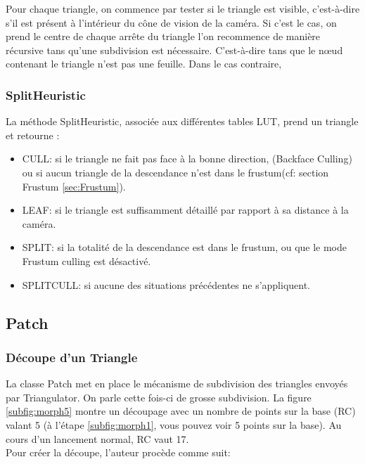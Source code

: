 	Pour chaque triangle, on commence par tester si le triangle est visible, c'est-à-dire s'il est
	présent à l'intérieur du cône de vision de la caméra. Si c'est le cas, on prend le centre de chaque
	arrête du triangle l'on recommence de manière récursive tans qu'une subdivision est nécessaire.
	C'est-à-dire tans que le n\oe{}ud contenant le triangle n'est pas une feuille. Dans le cas contraire,
	\fi	
	
	
    
	
	
	
	\subsubsection{SplitHeuristic}
	\label{sec:SplitHeuristic}
	La méthode SplitHeuristic, associée aux différentes tables LUT, prend un triangle et retourne :
	\begin{itemize} 
	\item CULL: 
	 \newline si le triangle ne fait pas face à la bonne direction, (Backface Culling) ou si aucun triangle de la descendance n'est dans le frustum(cf: section Frustum \ref{sec:Frustum}).
	\item LEAF: 
	\newline si le triangle est suffisamment détaillé par rapport à sa distance à la caméra.
	\item SPLIT: 
	\newline si la totalité de la descendance est dans le frustum, ou que le mode Frustum culling est désactivé.
	\item SPLITCULL:
	\newline si aucune des situations précédentes ne s'appliquent.
	\end{itemize}
	 
	

	
	
	\subsection{Patch}
	\subsubsection{Découpe d'un Triangle}
	La classe Patch met en place le mécanisme de subdivision des triangles envoyés par Triangulator. On parle cette fois-ci de grosse subdivision. La figure \ref{subfig:morph5} montre un découpage avec un nombre de points sur la base (RC) valant 5 (à l'étape \ref{subfig:morph1}, vous pouvez voir 5 points sur la base). Au cours d'un lancement normal, RC vaut 17.\\
	Pour créer la découpe, l'auteur procède comme suit:
